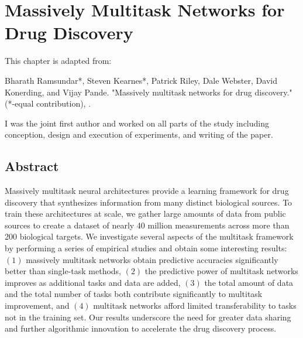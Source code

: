 

%

\section{Massively Multitask Networks for Drug Discovery}

This chapter is adapted from: 

Bharath Ramsundar*, Steven Kearnes*, Patrick Riley, Dale Webster, David Konerding, and Vijay Pande. "Massively multitask networks for drug discovery." (*-equal contribution), \cite{ramsundar2015massively}. 


I was the joint first author and worked on all parts of the study including conception, design and execution of experiments, and writing of the paper.


\subsection{Abstract}
Massively multitask neural architectures provide a learning framework for
drug discovery that synthesizes information from many distinct biological
sources. To train these architectures at scale, we gather large amounts of
data from public sources to create a dataset of nearly 40 million
measurements across more than 200 biological targets. We investigate
several aspects of the multitask framework by performing a series of
empirical studies and obtain some interesting results: $(1)$ massively
multitask networks obtain predictive accuracies significantly better than
single-task methods, $(2)$ the predictive power of multitask networks
improves as additional tasks and data are added, $(3)$ the total amount of
data and the total number of tasks both contribute significantly to
multitask improvement, and $(4)$ multitask networks afford limited
transferability to tasks not in the training set. Our results underscore
the need for greater data sharing and further algorithmic innovation to
accelerate the drug discovery process.


